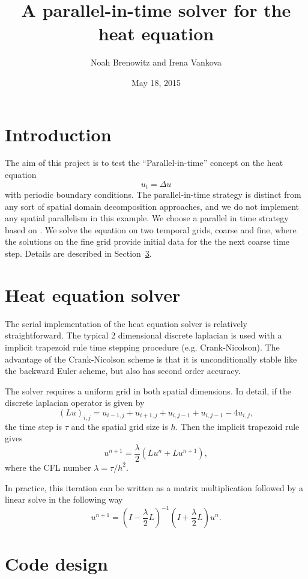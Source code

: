 \documentclass{article}
\title{A parallel-in-time solver for the heat equation}
\author{Noah Brenowitz and Irena Vankova}
\date{May 18, 2015}
\let\cite\citep
\begin{document}
\maketitle
\section{Introduction}
\label{sec:intro}

The aim of this project is to test the ``Parallel-in-time'' concept
on the heat equation 
\[ u_t = \Delta u \]
with periodic boundary conditions. 
The parallel-in-time strategy is distinct from any sort of spatial
domain decomposition approaches, and we do not implement any spatial
parallelism in this example. 
We choose a parallel in time strategy based on \cite{falgout2014parallel}. We solve the equation on two temporal grids, coarse and fine, where the solutions on the fine grid provide initial data for the the next coarse time step. Details are described in Section~\ref{sec:code}.

\section{Heat equation solver}
\label{sec:ehat}

The serial implementation of the heat equation solver is relatively
straightforward. The typical 2 dimensional discrete laplacian is used
with a implicit trapezoid rule time stepping procedure
(e.g. Crank-Nicolson). The advantage of the Crank-Nicolson scheme is
that it is unconditionally stable like the backward Euler scheme, but
also has second order accuracy.

The solver requires a uniform grid in both
spatial dimensions. In detail, if the discrete laplacian operator is
given by
\[ (L u)_{i,j} = u_{i-1,j} + u_{i+1,j} + u_{i,j-1} + u_{i, j-1} - 4 u_{i,j}, \]
the time step is $\tau$ and the spatial grid size is $h$. Then the
implicit trapezoid rule gives
\[ u^{n+1}  = \frac{\lambda}{2} \left( Lu^n + Lu^{n+1} \right),\]
where the CFL number $\lambda = \tau / h^{2}$.

In practice, this iteration can be written as a matrix
multiplication followed by a linear solve in the following way
\begin{equation}
  \label{eq:time-step}
  u^{n+1} = \left( I- \frac{\lambda}{2} L \right)^{-1} \left(I+\frac{\lambda}{2}L \right) u^n.
\end{equation}


\section{Code design}
\label{sec:code}
\end{document}
